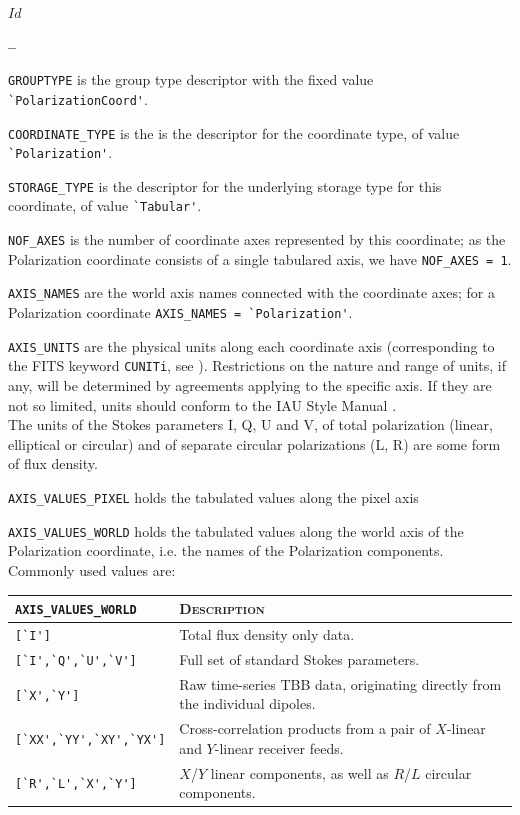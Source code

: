 \svnInfo $Id$




\begin{list}{\textbf{--}}{}
\item \verb|GROUPTYPE| is the group type descriptor with the fixed
  value \verb|`PolarizationCoord'|.
\item \verb|COORDINATE_TYPE| is the is the descriptor for the
  coordinate type, of value \verb|`Polarization'|.
\item \verb|STORAGE_TYPE| is the descriptor for the underlying storage
  type for this coordinate, of value \verb|`Tabular'|.
\item \verb|NOF_AXES| is the number of coordinate axes represented by
  this coordinate; as the Polarization coordinate consists of a single
  tabulared axis, we have \verb|NOF_AXES = 1|.
\item \verb|AXIS_NAMES| are the world axis names connected with the
  coordinate axes; for a Polarization coordinate \verb|AXIS_NAMES = `Polarization'|.
\item \verb|AXIS_UNITS| are the physical units along each coordinate axis
  (corresponding to the FITS keyword \verb|CUNITi|, see \cite{fits.paper1}).
  Restrictions on the nature and range of units, if any, will be determined by
  agreements applying to the specific axis. If they are not so limited, units
  should conform to the IAU Style Manual \cite{mcnally.1988}. \\ The
  units of the Stokes parameters I, Q, U and V, of total polarization
  (linear, elliptical or circular) and of separate circular
  polarizations (L, R) are some form of flux density. 
\item \verb|AXIS_VALUES_PIXEL| holds the tabulated values along the pixel axis
\item \verb|AXIS_VALUES_WORLD| holds the tabulated values along the world
  axis of the Polarization coordinate, i.e. the names of the Polarization
  components. Commonly used values are:
  \begin{center}
    \begin{tabular}{lp{10cm}}
      \verb|AXIS_VALUES_WORLD| & \textsc{Description} \\
      \hline
      \verb|[`I']| & Total flux density only data. \\
      \verb|[`I',`Q',`U',`V']| & Full set of standard Stokes
      parameters. \\
      \verb|[`X',`Y']| & Raw time-series TBB data, originating
      directly from the individual dipoles. \\
      \verb|[`XX',`YY',`XY',`YX']| & Cross-correlation products from a
      pair of $X$-linear and $Y$-linear receiver feeds. \\
      \verb|[`R',`L',`X',`Y']| & $X$/$Y$ linear components, as well as
      $R$/$L$ circular components. \\
      \hline
    \end{tabular}
  \end{center}
  

\end{list}

